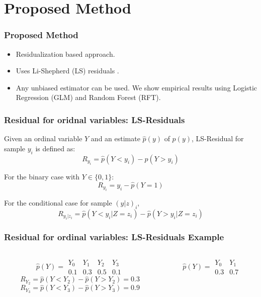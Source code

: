 \documentclass{beamer}
\begin{document}
\section{Proposed Method}
\begin{frame}
	\frametitle{Proposed Method}
	\begin{itemize}
		\setlength\itemsep{1em}
		\item Residualization based approach.
		\item Uses Li-Shepherd (LS) residuals \footnotemark. 
		\item Any unbiased estimator can be used. We show empirical results using Logistic Regression (GLM) and Random Forest (RFT).
	\end{itemize}
\end{frame}


\begin{frame}
	\frametitle{Residual for oridnal variables: LS-Residuals}
	Given an ordinal variable $ Y $ and an estimate $ \hat{p}(y) $ of $
	p(y) $, LS-Residual for sample $ y_i $ is defined as:
	$$ R_{y_i} = \hat{p}(Y < y_i) - \hat{p}(Y > y_i) $$
	\vspace{1em}

	For the binary case with $ Y \in \{0, 1\} $:
	$$ R_{y_i} = y_i - \hat{p}(Y = 1) $$
	\vspace{1em}

	For the conditional case for sample $ (y|z)_i $,
	$$ R_{y_i | z_i} = \hat{p}(Y < y_i | Z=z_i) - \hat{p}(Y>y_i|Z=z_i) $$

\end{frame}

\begin{frame}
	\frametitle{Residual for ordinal variables: LS-Residuals Example}
	\begin{columns}
		\begin{column}{0.5 \textwidth}
			$$ \hat{p}(Y) = \begin{array}{llll} Y_0 & Y_1 & Y_2 & Y_3 \\ 0.1 & 0.3 & 0.5 & 0.1 \end{array} $$
			$$ R_{Y_2} = \hat{p}(Y < Y_2) - \hat{p}(Y > Y_2) = 0.3 $$
			$$ R_{Y_3} = \hat{p}(Y < Y_3) - \hat{p}(Y > Y_3) = 0.9 $$
		\end{column}
		\begin{column}{0.5 \textwidth}
			$$ \hat{p}(Y) = \begin{array}{ll} Y_0 & Y_1 \\ 0.3 & 0.7 \end{array} $$
		\end{column}
	\end{columns}
\end{frame}
\end{document}
